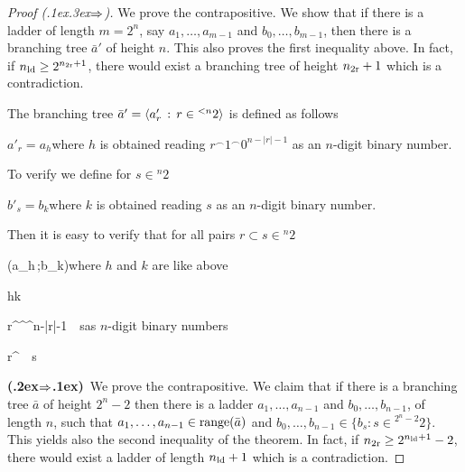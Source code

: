 \documentclass[scombinatorics.tex]{subfiles}
\begin{document}
\begin{proof}[Proof (\kern.1ex\kern.3ex\boldmath$\Rightarrow$)]





  
  We prove the contrapositive.
  We show that if there is a ladder of length $m=2^n$, say $a_1,\dots,a_{m-1}$ and $b_0,\dots,b_{m-1}$, then there is a branching tree $\bar a'$ of height $n$.
  This also proves the first inequality above.
  In fact, if $n_{\rm ld}\ge 2^{n_{\rm 2r}+1}$, there would exist a branching tree of height $n_{\rm 2r}+1$ which is a contradiction.
  
  The branching tree $\bar a'=\langle a'_r\, :\, r\in{}^{<n}2\rangle$ is defined as follows

  \quad $a'_r=a_h$\quad  where $h$ is obtained reading $r^\frown1^\frown0^{n-|r|-1}$ as an $n$-digit binary number.

  To verify  we define for $s\in{}^n2$ 
  
  \quad $b'_s=b_k$\quad  where $k$ is obtained reading $s$ as an $n$-digit binary number.

  Then it is easy to verify that for all pairs $r\subset s\in{}^n2$

  {\IFF}
  {\phi(a_h\,;b_k)}\hfill where $h$ and $k$ are like above

  \ceq{}
  {\IFF}
  {h\le k}

  \ceq{}
  {\IFF}
  {r^^^{n-|r|-1}\ \le\ s}\hfill  as $n$-digit binary numbers

  \ceq{}
  {\IFF}
  {r^\ \subseteq\ s}

  \textbf{(\kern.2ex\boldmath$\Rightarrow$\kern.1ex)}\ 
  We prove the contrapositive.
  We claim that if there is a branching tree $\bar a$ of height $2^n-2$ then there is a ladder $a_1,\dots,a_{n-1}$ and $b_0,\dots,b_{n-1}$, of length $n$, such that $a_1,\dots,a_{n-1} \in \mathop{\rm range}(\bar a)$ and $b_0,\dots,b_{n-1} \in \{b_s:s\in{}^{2^n-2}2\}$.
  This yields also the second inequality of the theorem.
  In fact, if $n_{\rm 2r}\ge 2^{n_{\rm ld}+1}-2$, there would exist a ladder of length $n_{\rm ld}+1$ which is a contradiction.


\end{proof}
\end{document}
